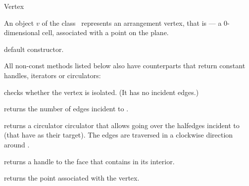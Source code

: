 
\ccRefPageBegin

\begin{ccRefClass}{Vertex}

\ccDefinition
An object $v$ of the class \ccRefName\ represents an arrangement vertex,
that is --- a $0$-dimensional cell, associated with a point on the plane. 

\ccInheritsFrom

\ccThreeToTwo

\ccCreation
{}

    {default constructor.}    

\ccAccessFunctions

All non-const methods listed below also have  counterparts
that return constant handles, iterators or circulators:

    {checks whether the vertex is isolated. (It has no incident edges.)}

    {returns the number of edges incident to \ccVar{}.}

\ccThreeToTwo

    {returns a circulator circulator that allows going over the halfedges
     incident to \ccVar{} (that have \ccVar{} as their target).
     The edges are traversed in a clockwise direction around \ccVar{}.
     }

\ccThreeToTwo

    {returns a handle to the face that contains \ccVar{} in its interior.
     }

    {returns the point associated with the vertex.}

\end{ccRefClass}

\ccRefPageEnd
